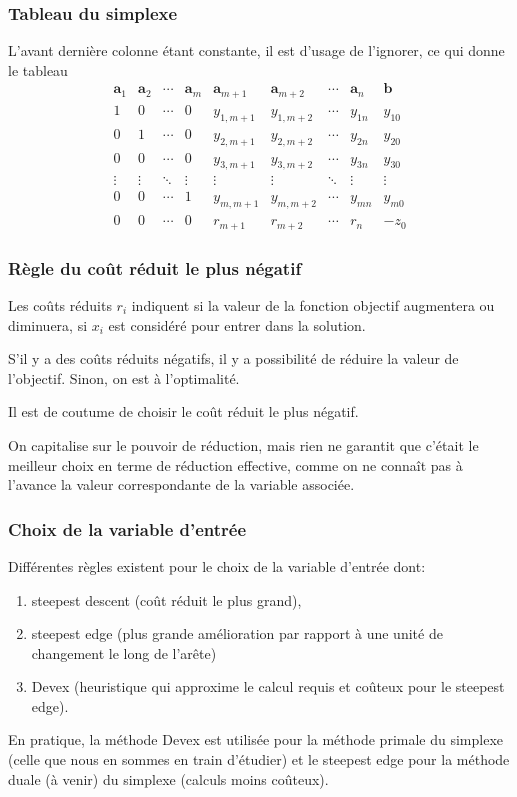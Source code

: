 \documentclass[t,usepdftitle=false]{beamer}
\def\ba{\boldsymbol{a}}
\def\bb{\boldsymbol{b}}
\begin{document}
\begin{frame}
\frametitle{Tableau du simplexe}

L'avant dernière colonne étant constante, il est d'usage de l'ignorer, ce qui donne le tableau
$$
\begin{matrix}
	\ba_1 & \ba_2 & \cdots & \ba_m & \ba_{m+1} &
	\ba_{m+2} & \cdots & \ba_n & \bb \\
	1 & 0 & \cdots & 0 & y_{1,m+1} & y_{1,m+2} & \cdots & y_{1n} & y_{10} \\
	0 & 1 & \cdots & 0 & y_{2,m+1} & y_{2,m+2} & \cdots & y_{2n} & y_{20} \\
	0 & 0 & \cdots & 0 & y_{3,m+1} & y_{3,m+2} & \cdots & y_{3n} & y_{30} \\
	\vdots & \vdots & \ddots & \vdots & \vdots & \vdots & \ddots & \vdots & \vdots \\
	0 & 0 & \cdots & 1 & y_{m,m+1} & y_{m,m+2} & \cdots & y_{mn} & y_{m0} \\
	0 & 0 & \cdots & 0 & r_{m+1} & r_{m+2} & \cdots & r_n & -z_0
\end{matrix}
$$

\end{frame}

\begin{frame}
\frametitle{Règle du coût réduit le plus négatif}

Les coûts réduits $r_i$ indiquent si la valeur de la fonction objectif augmentera ou diminuera, si $x_i$ est considéré pour entrer dans la solution.

\mbox{}

S'il y a des coûts réduits négatifs, il y a possibilité de réduire la valeur de l'objectif. Sinon, on est à l'optimalité.

\mbox{}

Il est de coutume de choisir le coût réduit le plus négatif.

\mbox{}

On capitalise sur le pouvoir de réduction, mais rien ne garantit que c'était le meilleur choix en terme de réduction effective, comme on ne connaît pas à l'avance la valeur correspondante de la variable associée.

\end{frame}

\begin{frame}
\frametitle{Choix de la variable d'entrée}

Différentes règles existent pour le choix de la variable
d’entrée dont:
\begin{enumerate}
\item
steepest descent (coût réduit le plus grand),
\item
steepest edge (plus grande amélioration par rapport à une unité de changement le long de l'arête)
\item
Devex (heuristique qui approxime le calcul requis et coûteux pour le steepest edge).
\end{enumerate}
En pratique, la méthode Devex est utilisée pour la méthode primale du simplexe (celle que nous en sommes en train d'étudier) et le steepest edge pour la méthode duale (à venir) du simplexe
(calculs moins coûteux).

\end{frame}
\end{document}
